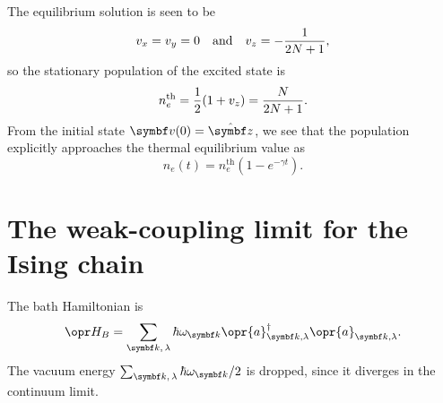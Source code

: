 \documentclass[../thesis.tex]{subfiles}
\begin{document}
The equilibrium solution is seen to be
\begin{equation}
  v_x
  = v_y
  = 0
  \qand
  v_z
  = -\frac{1}{2N + 1},
\end{equation}
so the stationary population of the excited state is
\begin{equation}
  n_e^\text{th}
  = \frac{1}{2}\qty(1 + v_z)
  = \frac{N}{2N + 1}.
\end{equation}
From the initial state $\vq{v}(0) = \vu{z}$, we see that the population
explicitly approaches the thermal equilibrium value as
\begin{equation}
  n_e(t)
  = n_e^\text{th}(1 - e^{-\gamma t}).
\end{equation}


\section{The weak-coupling limit for the Ising chain}\label{sec:weak-ising}

The bath Hamiltonian is
\begin{equation}
  \ham_B
  = \sum_{\vq{k},\, \lambda} \hbar\omega_{\vq{k}}
  \opr{a}^\dag_{\vq{k},\lambda}\opr{a}_{\vq{k},\lambda}.
  \label{eq:bath-hamiltonian}
\end{equation}
The vacuum energy $\sum_{\vq{k},\, \lambda} \hbar\omega_{\vq{k}} / 2$ is
dropped, since it diverges in the continuum limit.
\end{document}
